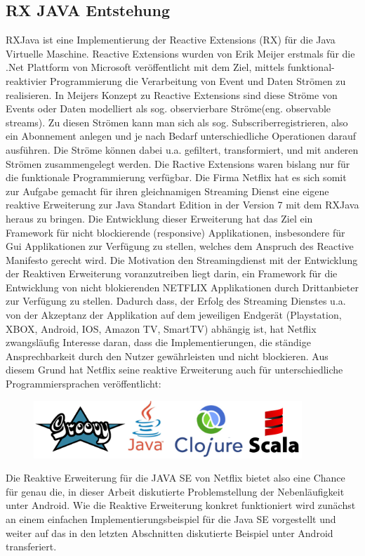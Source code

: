 \documentclass[12pt,oneside,a4paper,bibtotoc,liststotoc]{scrreprt}
\begin{document}
\subsection{RX JAVA Entstehung}
RXJava ist eine Implementierung der Reactive Extensions (RX) für die Java Virtuelle Maschine. Reactive Extensions wurden von Erik Meijer erstmals für die .Net Plattform von Microsoft veröffentlicht mit dem Ziel, mittels funktional-reaktivier Programmierung die Verarbeitung von Event und Daten Strömen zu realisieren. In Meijers Konzept zu Reactive Extensions sind diese Ströme von Events oder Daten modelliert als sog. \glqq observierbare Ströme\grqq (eng. observable streams). Zu diesen Strömen kann man sich als sog. \glqq Subscriber\grqq registrieren, also ein Abonnement anlegen und je nach Bedarf unterschiedliche Operationen darauf ausführen. Die Ströme können dabei u.a. gefiltert, transformiert, und mit anderen Strömen zusammengelegt werden. Die Ractive Extensions waren bislang nur für die funktionale Programmierung verfügbar. Die Firma Netflix hat es sich somit zur Aufgabe gemacht für ihren gleichnamigen Streaming Dienst eine eigene reaktive Erweiterung zur Java Standart Edition in der Version 7 mit dem RXJava heraus zu bringen. Die Entwicklung dieser Erweiterung hat das Ziel ein Framework für nicht blockierende (responsive) Applikationen, insbesondere für Gui Applikationen zur Verfügung zu stellen, welches dem Anspruch des Reactive Manifesto gerecht wird. Die Motivation den Streamingdienst mit  der Entwicklung der Reaktiven Erweiterung voranzutreiben liegt darin, ein Framework für die Entwicklung von nicht blokierenden NETFLIX Applikationen durch Drittanbieter zur Verfügung zu stellen. Dadurch dass, der Erfolg des Streaming Dienstes u.a. von der Akzeptanz der Applikation auf dem jeweiligen Endgerät (Playstation, XBOX, Android, IOS, Amazon TV, SmartTV) abhängig ist, hat Netflix zwangsläufig Interesse daran, dass die Implementierungen, die ständige Ansprechbarkeit durch den Nutzer gewährleisten und nicht blockieren. Aus diesem Grund hat Netflix seine reaktive Erweiterung auch für unterschiedliche Programmiersprachen veröffentlicht:
\begin{figure}[H]
  \begin{centering}
    \includegraphics[width=0.9\textwidth]{img/rx-languages.png}
    \label{rx-languages}
  \end{centering}
\end{figure}
Die Reaktive Erweiterung für die JAVA SE von Netflix bietet also eine Chance für genau die, in dieser Arbeit diskutierte Problemstellung der Nebenläufigkeit unter Android. Wie die Reaktive Erweiterung konkret funktioniert wird zunächst an einem einfachen Implementierungsbeispiel für die Java SE vorgestellt und weiter auf das in den letzten Abschnitten diskutierte Beispiel unter Android transferiert.
\end{document}
